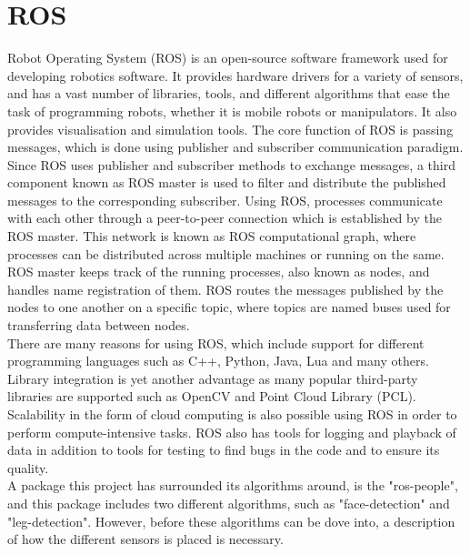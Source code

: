 \section{ROS}\label{sec:ROS}
Robot Operating System (ROS) is an open-source software framework used for developing robotics software. It provides hardware drivers for a variety of sensors, and has a vast number of libraries, tools, and different algorithms that ease the task of programming robots, whether it is mobile robots or manipulators. It also provides visualisation and simulation tools. The core function of ROS is passing messages, which is done using publisher and subscriber communication paradigm.
Since ROS uses publisher and subscriber methods to exchange messages, a third component known as ROS master is used to filter and distribute the published messages to the corresponding subscriber.
Using ROS, processes communicate with each other through a peer-to-peer connection which is established by the ROS master. This network is known as ROS computational graph, where processes can be distributed across multiple machines or running on the same. ROS master keeps track of the running processes, also known as nodes, and handles name registration of them. ROS routes the messages published by the nodes to one another on a specific topic, where topics are named buses used for transferring data between nodes.\\
There are many reasons for using ROS, which include support for different programming languages such as C++, Python, Java, Lua and many others. Library integration is yet another advantage as many popular third-party libraries are supported such as OpenCV and Point Cloud Library (PCL). Scalability in the form of cloud computing is also possible using ROS in order to perform compute-intensive tasks. ROS also has tools for logging and playback of data in addition to tools for testing to find bugs in the code and to ensure its quality.\cite{ROScorecomponent}\\
A package this project has surrounded its algorithms around, is the "ros-people", and this package includes two different algorithms, such as "face-detection" and "leg-detection". However, before these algorithms can be dove into, a description of how the different sensors is placed is necessary.